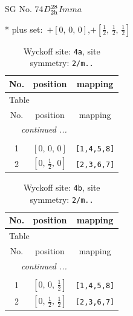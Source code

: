 \documentclass[fleqn,8pt]{jsarticle}
\begin{document}
\setcounter{MaxMatrixCols}{32}

\renewcommand{\tablename}{Table~}
\renewcommand{\figurename}{Figure~}
\begin{center}
\LARGE
SG No. 74\quad$D_{\rm 2h}^{28}$\quad$Imma$\quad[ orthorhombic ]
\end{center}
* plus set:\,\,\,$+\left[ 0,\, 0,\, 0 \right]$,\quad $+\left[ \frac{1}{2},\, \frac{1}{2},\, \frac{1}{2} \right]$
\renewcommand{\arraystretch}{1.2}
\begin{longtable}{ccc}
\caption{Wyckoff site: {\tt 4a}, site symmetry: {\tt 2/m..}}
 \\
 \hline \hline
No. & position & mapping \\ \hline \endfirsthead

\multicolumn{2}{l}{\tablename\ \thetable{}} \\
 \hline \hline
No. & position & mapping \\ \hline \endhead

 \hline \hline
\multicolumn{2}{r}{\footnotesize\it continued ...} \\ \endfoot

 \hline \hline
\multicolumn{2}{r}{} \\ \endlastfoot

1 & $\left[ 0,\, 0,\, 0 \right]$ & {\tt [1,4,5,8]} \\ \hline
2 & $\left[ 0,\, \frac{1}{2},\, 0 \right]$ & {\tt [2,3,6,7]} \\
\end{longtable}
\renewcommand{\arraystretch}{1.2}
\begin{longtable}{ccc}
\caption{Wyckoff site: {\tt 4b}, site symmetry: {\tt 2/m..}}
 \\
 \hline \hline
No. & position & mapping \\ \hline \endfirsthead

\multicolumn{2}{l}{\tablename\ \thetable{}} \\
 \hline \hline
No. & position & mapping \\ \hline \endhead

 \hline \hline
\multicolumn{2}{r}{\footnotesize\it continued ...} \\ \endfoot

 \hline \hline
\multicolumn{2}{r}{} \\ \endlastfoot

1 & $\left[ 0,\, 0,\, \frac{1}{2} \right]$ & {\tt [1,4,5,8]} \\ \hline
2 & $\left[ 0,\, \frac{1}{2},\, \frac{1}{2} \right]$ & {\tt [2,3,6,7]} \\
\end{longtable}
\end{document}
